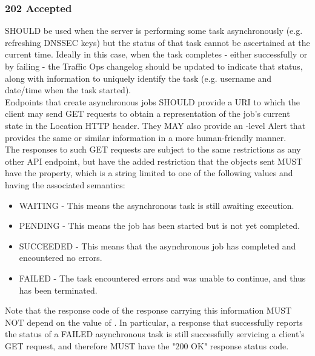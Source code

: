 \subsubsection{202 Accepted}
 SHOULD be used when the server is performing some task asynchronously (e.g. refreshing DNSSEC keys) but the status of that task
cannot be ascertained at the current time. Ideally in this case, when the task completes - either successfully or by failing - the Traffic Ops changelog
should be updated to indicate that status, along with information to uniquely identify the task (e.g. username and date/time when the task started).\\
Endpoints that create asynchronous jobs SHOULD provide a URI to which the
client may send GET requests to obtain a representation of the job's current
state in the Location HTTP header. They MAY also provide an -level
Alert that provides the same or similar information in a more human-friendly
manner.\\
The responses to such GET requests are subject to the same restrictions as any
other API endpoint, but have the added restriction that the 
objects sent MUST have the  property, which is a string limited to
one of the following values and having the associated semantics:

\begin{itemize}
	\item WAITING - This means the asynchronous task is still awaiting
		execution.
	\item PENDING - This means the job has been started but is not yet
		completed.
	\item SUCCEEDED - This means that the asynchronous job has completed and
		encountered no errors.
	\item FAILED - The task encountered errors and was unable to continue, and
		thus has been terminated.
\end{itemize}

Note that the response code of the response carrying this information MUST NOT
depend on the value of . In particular, a response that
successfully reports the status of a FAILED asynchronous task is still
successfully servicing a client's GET request, and therefore MUST have the
"200 OK" response status code.

